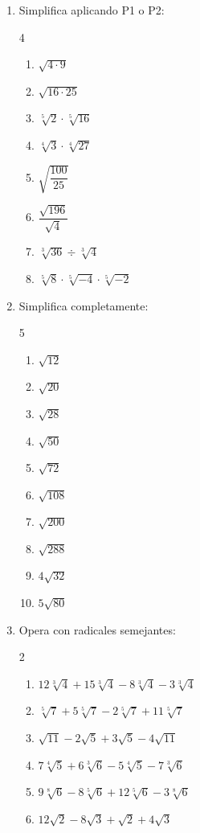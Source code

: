\documentclass[11pt, letterpaper]{article}
\begin{document}
\begin{enumerate}[label=\textbf{\arabic*.}, leftmargin=*]
  \item Simplifica aplicando P1 o P2:
  \begin{multicols}{4}
  \begin{enumerate}[label=\alph*)]
    \item $\sqrt{4\cdot 9}$
    \item $\sqrt{16\cdot 25}$
    \item $\sqrt[5]{2}\cdot\sqrt[5]{16}$
    \item $\sqrt[4]{3}\cdot\sqrt[4]{27}$
    \item $\sqrt{\dfrac{100}{25}}$
    \item $\dfrac{\sqrt{196}}{\sqrt{4}}$
    \item $\sqrt[3]{36}\div\sqrt[3]{4}$
    \item $\sqrt[5]{8}\cdot\sqrt[5]{-4}\cdot\sqrt[5]{-2}$
  \end{enumerate}
  \end{multicols}

  \item Simplifica completamente:
  \begin{multicols}{5}
  \begin{enumerate}[label=\alph*)]
    \item $\sqrt{12}$
    \item $\sqrt{20}$
    \item $\sqrt{28}$
    \item $\sqrt{50}$
    \item $\sqrt{72}$
    \item $\sqrt{108}$
    \item $\sqrt{200}$
    \item $\sqrt{288}$
    \item $4\sqrt{32}$
    \item $5\sqrt{80}$
  \end{enumerate}
  \end{multicols}

  \item Opera con radicales semejantes:
  \begin{multicols}{2}
  \begin{enumerate}[label=\alph*)]
    \item $12\sqrt[3]{4}+15\sqrt[3]{4}-8\sqrt[3]{4}-3\sqrt[3]{4}$
    \item $\sqrt[5]{7}+5\sqrt[5]{7}-2\sqrt[5]{7}+11\sqrt[5]{7}$
    \item $\sqrt{11}-2\sqrt{5}+3\sqrt{5}-4\sqrt{11}$
    \item $7\sqrt[4]{5}+6\sqrt[3]{6}-5\sqrt[4]{5}-7\sqrt[3]{6}$
    \item $9\sqrt[8]{6}-8\sqrt[5]{6}+12\sqrt[5]{6}-3\sqrt[8]{6}$
    \item $12\sqrt{2}-8\sqrt{3}+\sqrt{2}+4\sqrt{3}$
  \end{enumerate}
  \end{multicols}
\end{enumerate}
\end{document}
